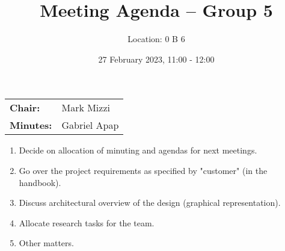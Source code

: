 \documentclass[11pt,a4paper]{scrartcl}
\title{Meeting Agenda -- Group 5}
\author{Location: 0 B 6}
\date{27 February 2023, 11:00 - 12:00}
\begin{document}
\maketitle
\begin{center}
\begin{tabular}{ll}
\textbf{Chair:}   & Mark Mizzi \\
\textbf{Minutes:} & Gabriel Apap
\end{tabular}
\end{center}

\begin{enumerate}

    \item Decide on allocation of minuting and agendas for next meetings.

    \item Go over the project requirements as specified by "customer" (in the handbook).
    
    \item Discuss architectural overview of the design (graphical representation).
    
    \item Allocate research tasks for the team.
    
    \item Other matters.

\end{enumerate}
\end{document}

